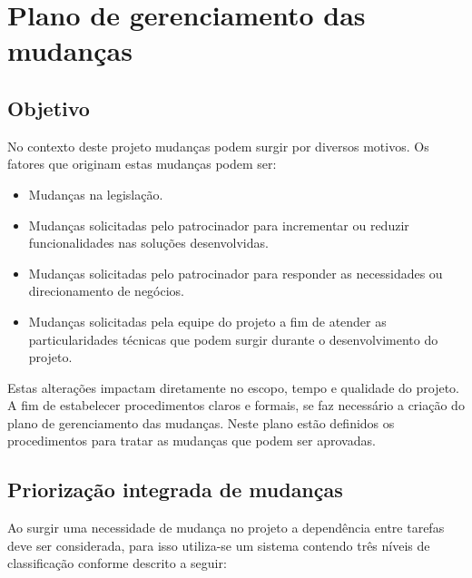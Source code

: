 \chapter{Plano de gerenciamento das mudanças} %
\label{ch:change-management-plan}

\section{Objetivo}

No contexto deste projeto mudanças podem surgir por diversos motivos. Os fatores que originam estas mudanças podem ser:

\begin{itemize}
	\item Mudanças na legislação.
	\item Mudanças solicitadas pelo patrocinador para incrementar ou reduzir funcionalidades nas soluções desenvolvidas.
	\item Mudanças solicitadas pelo patrocinador para responder as necessidades ou direcionamento de negócios.
	\item Mudanças solicitadas pela equipe do projeto a fim de atender as particularidades técnicas que podem surgir durante o desenvolvimento do projeto.
\end{itemize}

Estas alterações impactam diretamente no escopo, tempo e qualidade do projeto. A fim de estabelecer procedimentos claros e formais, se faz necessário a criação do plano de gerenciamento das mudanças. Neste plano estão definidos os procedimentos para tratar as mudanças que podem ser aprovadas.

\section{Priorização integrada de mudanças}
\label{sec:integrated-change-priorization}

Ao surgir uma necessidade de mudança no projeto a dependência entre tarefas deve ser considerada, para isso utiliza-se um sistema contendo três níveis de classificação conforme descrito a seguir:

